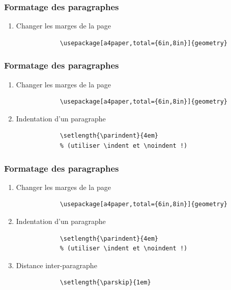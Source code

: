 \documentclass[handout]{beamer}
\begin{document}
	\begin{frame}[fragile=singleslide]
	\frametitle{Formatage des paragraphes}

	\begin{enumerate}
		\item Changer les marges  de la page\\
			\begin{verbatim}
			\usepackage[a4paper,total={6in,8in}]{geometry}
			\end{verbatim}
	\end{enumerate}
\end{frame}

\begin{frame}[fragile=singleslide]
	\frametitle{Formatage des paragraphes}

	\begin{enumerate}
		\item Changer les marges  de la page\\

			\begin{verbatim}
			\usepackage[a4paper,total={6in,8in}]{geometry}
			\end{verbatim}
		\item Indentation d'un paragraphe\\

			\begin{verbatim}
			\setlength{\parindent}{4em}
			% (utiliser \indent et \noindent !)
			\end{verbatim}
	\end{enumerate}
\end{frame}

\begin{frame}[fragile=singleslide]
	\frametitle{Formatage des paragraphes}

	\begin{enumerate}
		\item Changer les marges  de la page\\
			\begin{verbatim}
			\usepackage[a4paper,total={6in,8in}]{geometry}
			\end{verbatim}
		\item Indentation d'un paragraphe\\

			\begin{verbatim}
			\setlength{\parindent}{4em}
			% (utiliser \indent et \noindent !)
			\end{verbatim}
		\item Distance inter-paragraphe\\

			\begin{verbatim}
			\setlength{\parskip}{1em}
			\end{verbatim}
	\end{enumerate}
\end{frame}
\end{document}
